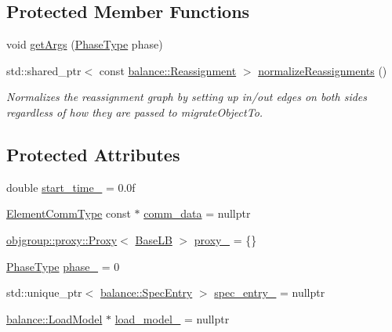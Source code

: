 \subsection*{Protected Member Functions}
\begin{DoxyCompactItemize}
\item 
void \hyperlink{structvt_1_1vrt_1_1collection_1_1lb_1_1_base_l_b_a4ec045a3c6231d055b6e851de3016bba}{get\+Args} (\hyperlink{namespacevt_a46ce6733d5cdbd735d561b7b4029f6d7}{Phase\+Type} phase)
\item 
std\+::shared\+\_\+ptr$<$ const \hyperlink{structvt_1_1vrt_1_1collection_1_1balance_1_1_reassignment}{balance\+::\+Reassignment} $>$ \hyperlink{structvt_1_1vrt_1_1collection_1_1lb_1_1_base_l_b_a9ecdb512cc5a87d637e48ab8d5b49b43}{normalize\+Reassignments} ()
\begin{DoxyCompactList}\small\item\em Normalizes the reassignment graph by setting up in/out edges on both sides regardless of how they are passed to {\ttfamily migrate\+Object\+To}. \end{DoxyCompactList}\end{DoxyCompactItemize}
\subsection*{Protected Attributes}
\begin{DoxyCompactItemize}
\item 
double \hyperlink{structvt_1_1vrt_1_1collection_1_1lb_1_1_base_l_b_a457dff7a12e34494fa0537c78120eb41}{start\+\_\+time\+\_\+} = 0.\+0f
\item 
\hyperlink{structvt_1_1vrt_1_1collection_1_1lb_1_1_base_l_b_a83eb4daec14edfb8780422e95b8e38d3}{Element\+Comm\+Type} const  $\ast$ \hyperlink{structvt_1_1vrt_1_1collection_1_1lb_1_1_base_l_b_a8d519b94ce4741da7049cb2b7b513963}{comm\+\_\+data} = nullptr
\item 
\hyperlink{structvt_1_1objgroup_1_1proxy_1_1_proxy}{objgroup\+::proxy\+::\+Proxy}$<$ \hyperlink{structvt_1_1vrt_1_1collection_1_1lb_1_1_base_l_b}{Base\+LB} $>$ \hyperlink{structvt_1_1vrt_1_1collection_1_1lb_1_1_base_l_b_ab5cfe4d0cb73397c5ffe937f119bc71a}{proxy\+\_\+} = \{\}
\item 
\hyperlink{namespacevt_a46ce6733d5cdbd735d561b7b4029f6d7}{Phase\+Type} \hyperlink{structvt_1_1vrt_1_1collection_1_1lb_1_1_base_l_b_a9bb7a04d3ef1012c95322d8375593498}{phase\+\_\+} = 0
\item 
std\+::unique\+\_\+ptr$<$ \hyperlink{structvt_1_1vrt_1_1collection_1_1balance_1_1_spec_entry}{balance\+::\+Spec\+Entry} $>$ \hyperlink{structvt_1_1vrt_1_1collection_1_1lb_1_1_base_l_b_a20ee2c313345b2fe60de1141f69774bd}{spec\+\_\+entry\+\_\+} = nullptr
\item 
\hyperlink{structvt_1_1vrt_1_1collection_1_1balance_1_1_load_model}{balance\+::\+Load\+Model} $\ast$ \hyperlink{structvt_1_1vrt_1_1collection_1_1lb_1_1_base_l_b_ae6cd8bdf27d81dc55f9eec9038b347dc}{load\+\_\+model\+\_\+} = nullptr
\end{DoxyCompactItemize}
